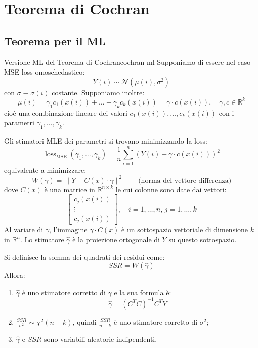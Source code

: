 \section{Teorema di Cochran}

\subsection{Teorema per il ML}
\begin{teorema}{Versione ML del Teorema di Cochran}{cochran-ml}
Supponiamo di essere nel caso MSE loss omoschedastico:
\[
Y(i) \sim \mathcal{N}(\mu(i), \sigma^2)
\]
con $\sigma \equiv \sigma(i)$ costante. Supponiamo inoltre:
\[
    \mu(i) = \gamma_1 c_1(x(i)) + \dots + \gamma_k c_k(x(i)) = \gamma \cdot c(x(i)), \quad \gamma,c \in \mathbb{R}^k
\]
cioè una combinazione lineare dei valori $c_1(x(i)), \ldots, c_k(x(i))$ con i parametri $\gamma_1, \ldots,
\gamma_k$.

Gli stimatori MLE dei parametri si trovano minimizzando la loss:
\[
\operatorname{loss}_{\text{MSE}}(\gamma_1, \dots, \gamma_k) = \frac{1}{n} \sum_{i=1}^n (Y(i) - \gamma \cdot c(x(i)))^2
\]
equivalente a minimizzare:
\[
    W(\gamma) = \| Y - C(x) \cdot \gamma \|^2 \qquad \text{(norma del vettore
    differenza)}
\]
dove $C(x)$ è una matrice in $\mathbb{R}^{n \times k}$ le cui colonne sono date dai vettori:
\[
\begin{bmatrix}
c_j(x(i)) \\
\vdots \\
c_j(x(i))
\end{bmatrix}, \quad i = 1, \dots, n,\, j = 1, \dots, k
\]
Al variare di $\gamma$, l'immagine $\gamma \cdot C(x)$ è un sottospazio vettoriale di dimensione $k$ in $\mathbb{R}^n$. Lo stimatore $\hat{\gamma}$ è la proiezione ortogonale di $Y$ su questo sottospazio.

Si definisce la somma dei quadrati dei residui come:
\[
    SSR = W(\hat{\gamma})
\]
Allora:
\begin{enumerate}
    \item $\hat{\gamma}$ è uno stimatore corretto di $\gamma$ e la sua formula è:
        \begin{equation*}\label{eq:cochran-gamma-estimator}
            \hat{\gamma} = (C^T C)^{-1} C^T Y
        \end{equation*}
    \item \( \frac{SSR}{\sigma^2} \sim \chi^2(n-k) \), quindi \( \frac{SSR}{n-k} \) è uno stimatore corretto di $\sigma^2$;
  \item $\hat{\gamma}$ e $SSR$ sono variabili aleatorie indipendenti.
\end{enumerate}
\end{teorema}


